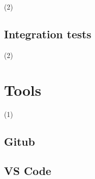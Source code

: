 (2)

\subsection{Integration tests}

(2)

\section{Tools}

(1)

\subsection{Gitub}

\subsection{VS Code}